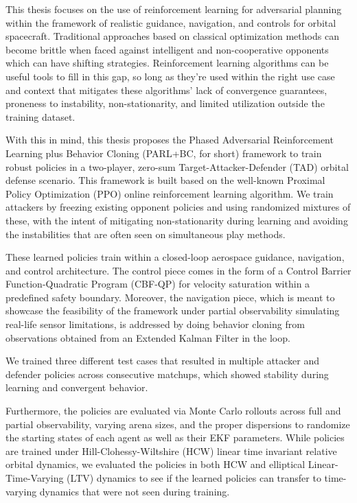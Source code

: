 This thesis focuses on the use of reinforcement learning for adversarial planning within the framework of realistic guidance, navigation, and controls for orbital spacecraft. Traditional approaches based on classical optimization methods can become brittle when faced against intelligent and non-cooperative opponents which can have shifting strategies. Reinforcement learning algorithms can be useful tools to fill in this gap, so long as they're used within the right use case and context that mitigates these algorithms' lack of convergence guarantees, proneness to instability, non-stationarity, and limited utilization outside the training dataset.

With this in mind, this thesis proposes the Phased Adversarial Reinforcement Learning plus Behavior Cloning (PARL+BC, for short) framework to train robust policies in a two-player, zero-sum Target-Attacker-Defender (TAD) orbital defense scenario. This framework is built based on the well-known Proximal Policy Optimization (PPO) online reinforcement learning algorithm. We train attackers by freezing existing opponent policies and using randomized mixtures of these, with the intent of mitigating non-stationarity during learning and avoiding the instabilities that are often seen on simultaneous play methods. 

These learned policies train within a closed-loop aerospace guidance, navigation, and control architecture. The control piece comes in the form of a Control Barrier Function-Quadratic Program (CBF-QP) for velocity saturation within a predefined safety boundary. Moreover, the navigation piece, which is meant to showcase the feasibility of the framework under partial observability simulating real-life sensor limitations, is addressed by doing behavior cloning from observations obtained from an Extended Kalman Filter in the loop.

We trained three different test cases that resulted in multiple attacker and defender policies across consecutive matchups, which showed stability during learning and convergent behavior.

Furthermore, the policies are evaluated via Monte Carlo rollouts across full and partial observability, varying arena sizes, and the proper dispersions to randomize the starting states of each agent as well as their EKF parameters. While policies are trained under Hill-Clohessy-Wiltshire (HCW) linear time invariant relative orbital dynamics, we evaluated the policies in both HCW and elliptical Linear-Time-Varying (LTV) dynamics to see if the learned policies can transfer to time-varying dynamics that were not seen during training.

